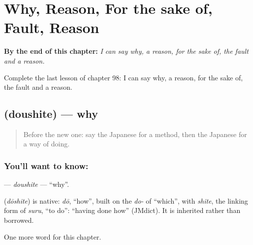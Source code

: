 
\chapter{Why, Reason, For the sake of, Fault, Reason}
\label{ch:ja-why-reason-for-the-sake-of-fault-reason}

\begin{chapteropening}
\textbf{By the end of this chapter:} \emph{I can say why, a reason, for the sake of, the fault and a reason.}

Complete the last lesson of chapter 98: I can say why, a reason, for the sake of, the fault and a reason.
\end{chapteropening}

\section[\texorpdfstring{\ja{どうして} (doushite)}{どうして (doushite)}]{ (doushite) — why}

\label{lesson:JA-C98-doushite}



\begin{quote}
Before the new one: say the Japanese for a method, then the Japanese for a way of doing.
\end{quote}

\subsection*{You'll want to know: }
\textbf{} — \emph{doushite} — \textquotedblleft{}why\textquotedblright{}.

\begin{cousinweb}
\textbf{} (\emph{dōshite}) is native: \emph{dō}, \textquotedblleft{}how\textquotedblright{}, built on the \emph{do-} of \textquotedblleft{}which\textquotedblright{}, with \emph{shite}, the linking form of \emph{suru}, \textquotedblleft{}to do\textquotedblright{}: \textquotedblleft{}having done how\textquotedblright{} (JMdict). It is inherited rather than borrowed.
\end{cousinweb}

\begin{grammarlens}[title={What you've built}]
One more word for this chapter.
\end{grammarlens}

